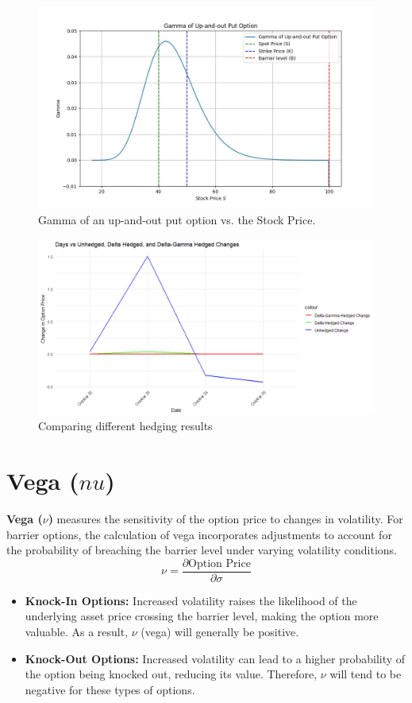 \begin{figure}[h]
	\centering
	\includegraphics[width=.65\linewidth]{content/images/gamma-upout.png}
	\caption{Gamma of an up-and-out put option vs. the Stock Price.}
	\label{fig:gamma_behavior}
\end{figure}

\begin{figure}[h]
	\centering
	\includegraphics[width=.65\linewidth]{content/images/compare_hedging.png}
	\caption{Comparing different hedging results}
	\label{fig:compare_deltagamma_hedge}
\end{figure}


\section{Vega ($nu$)}

\textbf{Vega (\(\nu\))} measures the sensitivity of the option price to changes in volatility. For barrier options, the calculation of vega incorporates adjustments to account for the probability of breaching the barrier level under varying volatility conditions.
\[
\nu = \frac{\partial \text{Option Price}}{\partial \sigma}
\]

\begin{itemize}
	\item \textbf{Knock-In Options:} Increased volatility raises the likelihood of the underlying asset price crossing the barrier level, making the option more valuable. As a result, \(\nu\) (vega) will generally be positive.
	\item \textbf{Knock-Out Options:} Increased volatility can lead to a higher probability of the option being knocked out, reducing its value. Therefore, \(\nu\) will tend to be negative for these types of options.
\end{itemize}

